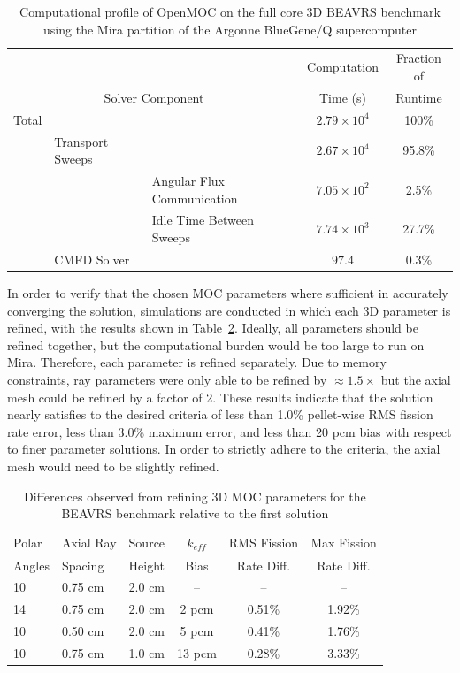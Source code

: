 \documentclass[12pt,twoside]{mitthesis-exec}
\begin{document}
\begin{table}[ht]
	\centering
	\caption{Computational profile of OpenMOC on the full core 3D BEAVRS benchmark using the Mira partition of the Argonne BlueGene/Q supercomputer}
	\medskip
	\begin{tabular}{lll|c|c}
		\hline
		& & & Computation & Fraction of \\
		\multicolumn{3}{c|}{Solver Component} & Time (s) & Runtime\\
		\hline
		Total & & & $2.79 \times 10^4$ & 100\% \\
		& Transport Sweeps & & $2.67 \times 10^4$ & 95.8\% \\
		& & Angular Flux Communication & $7.05 \times 10^2$ & 2.5\% \\
		& & Idle Time Between Sweeps & $7.74 \times 10^3$ & 27.7\% \\
		& CMFD Solver & & $97.4$ & 0.3\% \\		
		\hline
	\end{tabular}
	\label{tab:full-core-comp-prof}
\end{table}

\newpage

            
In order to verify that the chosen MOC parameters where sufficient in accurately converging the solution, simulations are conducted in which each 3D parameter is refined, with the results shown in Table~\ref{tab:fc-param-sensitivity}. Ideally, all parameters should be refined together, but the computational burden would be too large to run on Mira. Therefore, each parameter is refined separately. Due to memory constraints, ray parameters were only able to be refined by $\approx 1.5 \times$ but the axial mesh could be refined by a factor of 2. These results indicate that the solution nearly satisfies to the desired criteria of less than 1.0\% pellet-wise RMS fission rate error, less than 3.0\% maximum error, and less than 20 pcm bias with respect to finer parameter solutions. In order to strictly adhere to the criteria, the axial mesh would need to be slightly refined.

\begin{table}[ht]
	\centering
	\caption{Differences observed from refining 3D MOC parameters for the BEAVRS benchmark relative to the first solution}
	\medskip
	\begin{tabular}{l|l|l|c|c|c}
		\hline
		Polar  & Axial Ray & Source & $k_{\textit{eff}}$  & RMS Fission & Max Fission \\
		Angles & Spacing   & Height & Bias                & Rate Diff. & Rate Diff. \\
		\hline
		10 & 0.75 cm & 2.0 cm & --     & --     & --  \\
		14 & 0.75 cm & 2.0 cm & 2 pcm  & 0.51\% & 1.92\%  \\
		10 & 0.50 cm & 2.0 cm & 5 pcm  & 0.41\% & 1.76\%  \\
		10 & 0.75 cm & 1.0 cm & 13 pcm & 0.28\% & 3.33\%  \\
		\hline
	\end{tabular}
	\label{tab:fc-param-sensitivity}
\end{table}
\end{document}
